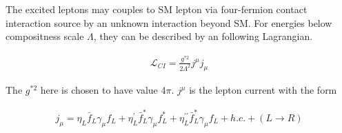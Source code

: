 The excited leptons may couples to SM lepton via four-fermion contact interaction source by an unknown interaction beyond SM. For energies below compositness scale $\Lambda$, they can be described by an following Lagrangian.

\begin{align}
\mathcal{L}_{CI} = \frac{g^{*2}}{2\Lambda^{2}}j^{\mu}j_{\mu}
\end{align}

\noindent The $g^{*2}$ here is chosen to have value 4$\pi$. $j^{\mu}$ is the lepton current with the form

\begin{align}
j_{\mu} = \eta_{L}\bar{f}_{L}\gamma_{\mu}f_{L} + \eta_{L}^{\prime}\bar{f}_{L}^{*}\gamma_{\mu}f_{L}^{*} + \eta_{L}^{\prime\prime}\bar{f}_{L}^{*}\gamma_{\mu}f_{L} + h.c. + (L \rightarrow R)
\end{align}

